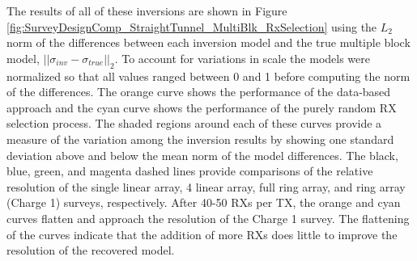 \documentclass[preprint,authoryear,12pt]{elsarticle}
\begin{document}
The results of all of these inversions are shown in Figure \ref{fig:SurveyDesignComp_StraightTunnel_MultiBlk_RxSelection} using the $L_2$ norm of the differences between each inversion model and the true multiple block model, $\left|| \sigma_{inv} - \sigma_{true} \right||_2$. To account for variations in scale the models were normalized so that all values ranged between 0 and 1 before computing the norm of the differences. The orange curve shows the performance of the data-based approach and the cyan curve shows the performance of the purely random RX selection process. The shaded regions around each of these curves provide a measure of the variation among the inversion results by showing one standard deviation above and below the mean norm of the model differences. The black, blue, green, and magenta dashed lines provide comparisons of the relative resolution of the single linear array, 4 linear array, full ring array, and ring array (Charge 1) surveys, respectively. After 40-50 RXs per TX, the orange and cyan curves flatten and approach the resolution of the Charge 1 survey. The flattening of the curves indicate that the addition of more RXs does little to improve the resolution of the recovered model.
\end{document}
